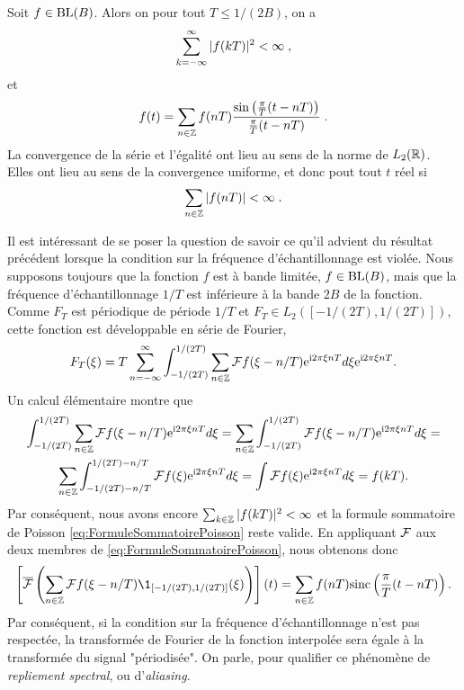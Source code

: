\begin{theorem}
Soit $f \in \mathrm{BL}(B)$. Alors on pour tout $T \leq 1/(2B)$, on a
$$
\sum_{k= - \infty}^\infty |f(kT)|^2 < \infty \;,
$$
et
$$
f(t) = \sum_{n \in \mathbb{Z}} f(nT) \frac{\sin\left( \frac{\pi}{T}(t - nT)\right)}{\frac{\pi}{T}(t-nT)} \;.
$$
La convergence de la s{\'e}rie et l'{\'e}galit{\'e} ont lieu au sens de la norme de $L_2(\mathbb{R})$. Elles ont lieu au sens de la convergence
uniforme, et donc pout tout $t$ r{\'e}el si
$$
\sum_{n \in \mathbb{Z}} |f(nT)| < \infty \;.
$$
\end{theorem}
Il est int{\'e}ressant de se poser la question de savoir ce qu'il advient du r{\'e}sultat pr{\'e}c{\'e}dent
lorsque la condition sur la fr{\'e}quence d'{\'e}chantillonnage est viol{\'e}e.
Nous supposons toujours que la fonction $f$ est {\`a} bande limit{\'e}e, $f \in \mathrm{BL}(B)$, mais  que la fr{\'e}quence d'{\'e}chantillonnage $1/T $ est inf{\'e}rieure
{\`a} la bande $ 2 B$ de la fonction. Comme $F_T$ est p{\'e}riodique de p{\'e}riode $1/T$ et
$F_T \in L_2([-1/(2T),1/(2T)])$, cette fonction est d{\'e}veloppable en s{\'e}rie de Fourier,
$$
F_T(\xi)= T \sum_{n=-\infty}^{\infty} \int_{-1/(2T)}^{1/(2T)} \sum_{n \in \mathbb{Z}} \mathcal{F} f(\xi - n/T) \mathrm{e}^{\mathrm{i} 2 \pi \xi n T} d \xi \mathrm{e}^{\mathrm{i} 2 \pi \xi n T}.
$$
Un calcul {\'e}l{\'e}mentaire montre que
\begin{multline*}
\int_{-1/(2T)}^{1/(2T)} \sum_{n \in \mathbb{Z}} \mathcal{F} f(\xi - n/T) \mathrm{e}^{\mathrm{i} 2 \pi \xi n T} d \xi = \sum_{n \in \mathbb{Z}} \int_{-1/(2T)}^{1/(2T)}  \mathcal{F} f(\xi - n/T) \mathrm{e}^{\mathrm{i} 2 \pi \xi n T} d \xi = \\
\sum_{n \in \mathbb{Z}} \int_{-1/(2T)-n/T}^{1/(2T)-n/T}  \mathcal{F} f(\xi) \mathrm{e}^{\mathrm{i} 2 \pi \xi n T} d \xi = \int \mathcal{F} f(\xi) \mathrm{e}^{\mathrm{i} 2 \pi \xi n T} d \xi = f(kT).
\end{multline*}
Par cons{\'e}quent, nous avons encore $\sum_{k \in \mathbb{Z}} |f(kT)|^2 < \infty$ et la formule sommatoire de Poisson \eqref{eq:FormuleSommatoirePoisson} reste valide.
En appliquant $\mathcal{F}$ aux deux membres de \eqref{eq:FormuleSommatoirePoisson}, nous obtenons donc
$$
\left[\TFAC{\sum_{n \in \zset} \TF f(\xi - n /T) \1_{[-1/(2T),1/(2T)]}(\xi)}\right](t)
= \sum_{n \in \zset} f(nT) \mathrm{sinc} \left( \frac{\pi}{T}(t-nT) \right).
$$
Par cons{\'e}quent, si la condition sur la fr{\'e}quence d'{\'e}chantillonnage n'est pas respect{\'e}e, la transform{\'e}e de Fourier de la fonction interpol{\'e}e sera {\'e}gale
{\`a} la transform{\'e}e du signal "p{\'e}riodis{\'e}e". On parle, pour qualifier ce ph{\'e}nom{\`e}ne de  \emph{repliement spectral}, ou d'\emph{aliasing}.


